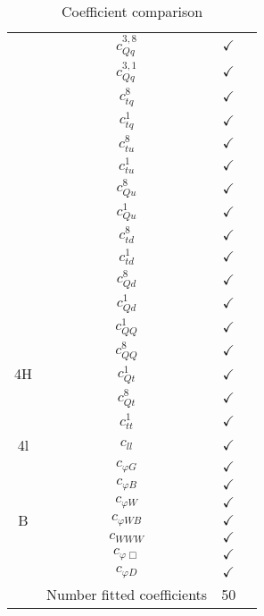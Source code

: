 \documentclass{article}
\begin{document}
\begin{table}[H]
\begin{tabular}{|c|c|c|c|}
 & $c_{Qq}^{3,8}$ & $\checkmark$ & \\ \cline{2-4}
 & $c_{Qq}^{3,1}$ & $\checkmark$ & \\ \cline{2-4}
 & $c_{tq}^{8}$ & $\checkmark$ & \\ \cline{2-4}
 & $c_{tq}^{1}$ & $\checkmark$ & \\ \cline{2-4}
 & $c_{tu}^{8}$ & $\checkmark$ & \\ \cline{2-4}
 & $c_{tu}^{1}$ & $\checkmark$ & \\ \cline{2-4}
 & $c_{Qu}^{8}$ & $\checkmark$ & \\ \cline{2-4}
 & $c_{Qu}^{1}$ & $\checkmark$ & \\ \cline{2-4}
 & $c_{td}^{8}$ & $\checkmark$ & \\ \cline{2-4}
 & $c_{td}^{1}$ & $\checkmark$ & \\ \cline{2-4}
 & $c_{Qd}^{8}$ & $\checkmark$ & \\ \cline{2-4}
 & $c_{Qd}^{1}$ & $\checkmark$ & 
\\ \hline
\multirow{5}{*}{4H}
 & $c_{QQ}^{1}$ & $\checkmark$ & \\ \cline{2-4}
 & $c_{QQ}^{8}$ & $\checkmark$ & \\ \cline{2-4}
 & $c_{Qt}^{1}$ & $\checkmark$ & \\ \cline{2-4}
 & $c_{Qt}^{8}$ & $\checkmark$ & \\ \cline{2-4}
 & $c_{tt}^{1}$ & $\checkmark$ & 
\\ \hline
\multirow{1}{*}{4l}
 & $c_{ll}$ & $\checkmark$ & 
\\ \hline
\multirow{7}{*}{B}
 & $c_{\varphi G}$ & $\checkmark$ & \\ \cline{2-4}
 & $c_{\varphi B}$ & $\checkmark$ & \\ \cline{2-4}
 & $c_{\varphi W}$ & $\checkmark$ & \\ \cline{2-4}
 & $c_{\varphi WB}$ & $\checkmark$ & \\ \cline{2-4}
 & $c_{WWW}$ & $\checkmark$ & \\ \cline{2-4}
 & $c_{\varphi \Box}$ & $\checkmark$ & \\ \cline{2-4}
 & $c_{\varphi D}$ & $\checkmark$ & 
\\ \hline
\hline & Number fitted coefficients & 50 &  \\ \hline
\end{tabular}
\caption{Coefficient comparison}
\end{table}
\end{document}
